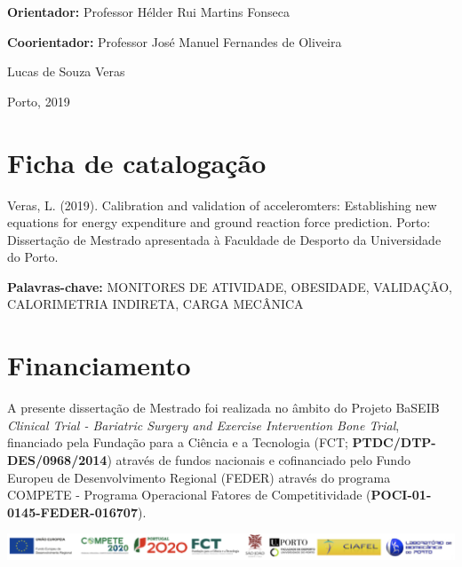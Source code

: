 \documentclass[12pt]{article}
\begin{document}
\vspace{\fill}

\noindent \textbf{Orientador:} Professor Hélder Rui Martins Fonseca

\noindent \textbf{Coorientador:} Professor José Manuel Fernandes de Oliveira

\medskip

\begin{center}
Lucas de Souza Veras

Porto, 2019
\end{center}
\thispagestyle{empty}

\pagebreak

\section*{\hfil Ficha de catalogação \hfil}

\vspace{\fill}

\noindent Veras, L. (2019). Calibration and validation of acceleromters: Establishing new equations for energy expenditure and ground reaction force prediction. Porto: Dissertação de Mestrado apresentada à Faculdade de Desporto da Universidade do Porto.

\bigskip

\noindent \textbf{Palavras-chave:} MONITORES DE ATIVIDADE, OBESIDADE, VALIDAÇÃO, CALORIMETRIA INDIRETA, CARGA MECÂNICA

\pagebreak

\section*{\hfil Financiamento \hfil}

\vspace{\fill}

\noindent A presente dissertação de Mestrado foi realizada no âmbito do Projeto BaSEIB \textit{Clinical Trial - Bariatric Surgery and Exercise Intervention Bone Trial}, financiado pela Fundação para a Ciência e a Tecnologia (FCT; \textbf{PTDC/DTP-DES/0968/2014}) através de fundos nacionais e cofinanciado pelo Fundo Europeu de Desenvolvimento Regional (FEDER) através do programa COMPETE - Programa Operacional Fatores de Competitividade (\textbf{POCI-01-0145-FEDER-016707}).

\vspace{2em}

\begin{center}
\includegraphics[width=\columnwidth]{figs/funding.png}
\end{center}
\end{document}
